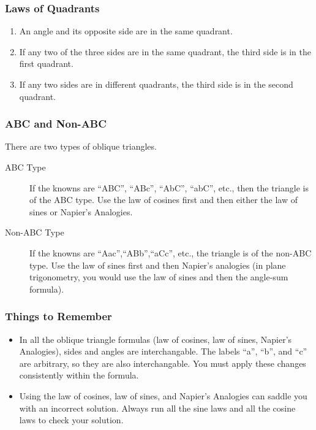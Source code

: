 \documentclass[xcolor=dvipsnames]{beamer}
\begin{document}
\begin{frame}
  \frametitle{Laws of Quadrants}
  \begin{enumerate}
  \item An angle and its opposite side are in the same quadrant.
  \item If any two of the three sides are in the same quadrant, the
    third side is in the first quadrant.
  \item If any two sides are in different quadrants, the third side is
    in the second quadrant.
  \end{enumerate}
\end{frame}

\begin{frame}
  \frametitle{ABC and Non-ABC}
  There are two types of oblique triangles.
  \begin{description}
  \item[ABC Type] If the knowns are ``ABC'', ``ABc'', ``AbC'', ``abC'', etc.,
    then the triangle is of the ABC type. Use the law of cosines first
    and then either the law of sines or Napier's Analogies.
  \item[Non-ABC Type] If the knowns are ``Aac'',``ABb'',``aCc'', etc., the
    triangle is of the non-ABC type. Use the law of sines first and
    then Napier's analogies (in plane trigonometry, you would use the
    law of sines and then the angle-sum formula).
  \end{description}
\end{frame}

\begin{frame}
  \frametitle{Things to Remember}
  \begin{itemize}
  \item In all the oblique triangle formulas (law of cosines, law of
    sines, Napier's Analogies), sides and angles are interchangable.
    The labels ``a'', ``b'', and ``c'' are arbitrary, so they are also
    interchangable. You must apply these changes consistently within
    the formula.
  \item Using the law of cosines, law of sines, and Napier's Analogies
    can saddle you with an incorrect solution. Always run all the sine
    laws and all the cosine laws to check your solution.
  \end{itemize}
\end{frame}
\end{document}
